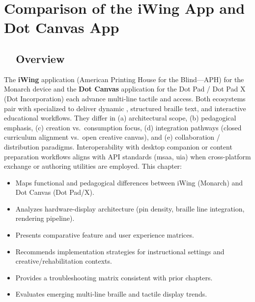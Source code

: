 \chapter{Comparison of the iWing App and Dot Canvas App}
\label{chap:iwIng-vs-dotcanvas}

\section{~~Overview}
\label{sec:sr29-overview}
The \textbf{iWing} application (American Printing House for the Blind—APH) for the Monarch  device and the \textbf{Dot Canvas} application for the Dot Pad / Dot Pad X (Dot Incorporation) each advance multi-line tactile and  access. Both ecosystems pair  with specialized  to deliver dynamic , structured braille text, and interactive educational workflows. They differ in (a) architectural scope, (b) pedagogical emphasis, (c) creation vs.\ consumption focus, (d) integration pathways (closed curriculum alignment vs.\ open creative canvas), and (e) collaboration / distribution paradigms. Interoperability with desktop companion or content preparation workflows aligns with  API standards (\gls{msaa}, \gls{uia}) when cross-platform exchange or authoring utilities are employed. This chapter:
\begin{itemize}
	\item Maps functional and pedagogical differences between iWing (Monarch) and Dot Canvas (Dot Pad/X).
	\item Analyzes hardware-display architecture (pin density, braille line integration, rendering pipeline).
	\item Presents comparative feature and user experience matrices.
	\item Recommends implementation strategies for instructional settings and creative/rehabilitation contexts.
	\item Provides a troubleshooting matrix consistent with prior chapters.
	\item Evaluates emerging multi-line braille and tactile display trends.
\end{itemize}


